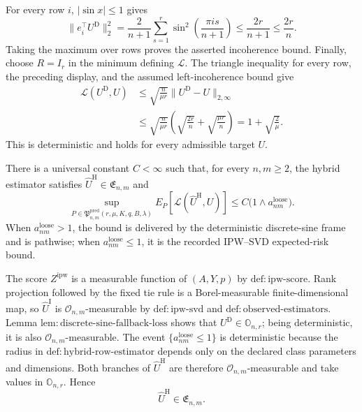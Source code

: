 For every row \(i\), \(|\sin x|\le1\) gives
\[
 \lVert e_i^\top U^{\mathrm D}\rVert_2^2
 =\frac2{n+1}\sum_{s=1}^r
 \sin^2\!\left(\frac{\pi i s}{n+1}\right)
 \le\frac{2r}{n+1}\le\frac{2r}{n}.
\]
Taking the maximum over rows proves the asserted incoherence bound.  Finally, choose \(R=I_r\) in the minimum defining \(\mathcal L\).  The triangle inequality for every row, the preceding display, and the assumed left-incoherence bound give
\[
 \begin{aligned}
 \mathcal L(U^{\mathrm D},U)
 &\le\sqrt{\frac n{\mu r}}
 \lVert U^{\mathrm D}-U\rVert_{2,\infty}\\
 &\le\sqrt{\frac n{\mu r}}
 \left(\sqrt{\frac{2r}{n}}+\sqrt{\frac{\mu r}{n}}\right)
 =1+\sqrt{\frac2\mu}.
 \end{aligned}
\]
This is deterministic and holds for every admissible target \(U\).

There is a universal constant \(C<\infty\) such that, for every \(n,m\ge2\), the hybrid estimator satisfies \(\widehat U^{\mathrm H}\in\mathfrak E_{n,m}\) and
\[
 \sup_{P\in\mathfrak P^{\mathrm{pred}}_{n,m}(r,\mu,K,q,B,\lambda)}
 E_P\!\left[\mathcal L(\widehat U^{\mathrm H},U)\right]
 \le C\bigl(1\wedge a^{\mathrm{loose}}_{nm}\bigr).
\]
When \(a^{\mathrm{loose}}_{nm}>1\), the bound is delivered by the deterministic discrete-sine frame and is pathwise; when \(a^{\mathrm{loose}}_{nm}\le1\), it is the recorded IPW--SVD expected-risk bound.

The score \(Z^{\mathrm{ipw}}\) is a measurable function of \((A,Y,p)\) by \(\mathrm{def:ipw\mbox{-}score}\).  Rank projection followed by the fixed tie rule is a Borel-measurable finite-dimensional map, so \(\widehat U^{\mathrm I}\) is \(\mathcal O_{n,m}\)-measurable by \(\mathrm{def:ipw\mbox{-}svd}\) and \(\mathrm{def:observed\mbox{-}estimators}\).  Lemma \(\mathrm{lem:discrete\mbox{-}sine\mbox{-}fallback\mbox{-}loss}\) shows that \(U^{\mathrm D}\in\mathbb O_{n,r}\); being deterministic, it is also \(\mathcal O_{n,m}\)-measurable.  The event \(\{a^{\mathrm{loose}}_{nm}\le1\}\) is deterministic because the radius in \(\mathrm{def:hybrid\mbox{-}row\mbox{-}estimator}\) depends only on the declared class parameters and dimensions.  Both branches of \(\widehat U^{\mathrm H}\) are therefore \(\mathcal O_{n,m}\)-measurable and take values in \(\mathbb O_{n,r}\).  Hence
\[
 \widehat U^{\mathrm H}\in\mathfrak E_{n,m}.
\]


